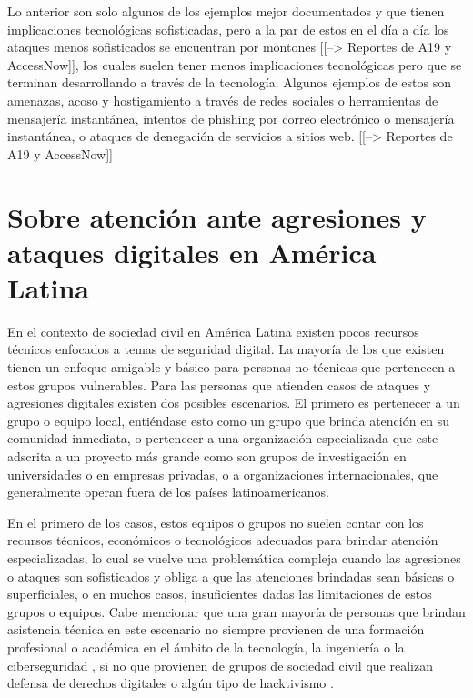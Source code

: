 \documentclass[12pt]{caltech_thesis}
\begin{document}
Lo anterior son solo algunos de los ejemplos mejor documentados y que tienen implicaciones tecnológicas sofisticadas, pero a la par de estos en el día a día los ataques menos sofisticados se encuentran por montones [[--> Reportes de A19 y AccessNow]], los cuales suelen tener menos implicaciones tecnológicas pero que se terminan desarrollando a través de la tecnología. Algunos ejemplos de estos son amenazas, acoso y hostigamiento a través de redes sociales o herramientas de mensajería instantánea, intentos de phishing por correo electrónico o mensajería instantánea, o ataques de denegación de servicios a sitios web. [[--> Reportes de A19 y AccessNow]]

\section{Sobre atención ante agresiones y ataques digitales en América Latina}

En el contexto de sociedad civil en América Latina  existen pocos recursos técnicos enfocados a temas de seguridad digital. La mayoría de los que existen tienen un enfoque amigable y básico para personas no técnicas que pertenecen a estos grupos vulnerables. Para las personas que atienden casos de ataques y agresiones digitales existen dos posibles escenarios. El primero es pertenecer a un grupo o equipo local, entiéndase esto como un grupo que brinda atención en su comunidad inmediata, o pertenecer a una organización especializada que este adscrita a un proyecto más grande como son grupos de investigación en universidades o en empresas privadas, o a organizaciones internacionales, que generalmente operan fuera de los países latinoamericanos.

En el primero de los casos, estos equipos o grupos no suelen contar con los recursos técnicos, económicos o tecnológicos adecuados para brindar atención especializadas, lo cual se vuelve una problemática compleja cuando las agresiones o ataques son sofisticados y obliga a que las atenciones brindadas sean básicas o superficiales, o en muchos casos, insuficientes dadas las limitaciones de estos grupos o equipos. Cabe mencionar que una gran mayoría de personas que brindan asistencia técnica en este escenario no siempre provienen de una formación profesional o académica en el ámbito de la tecnología, la ingeniería o la ciberseguridad , si no que provienen de grupos de sociedad civil que realizan defensa de derechos digitales  o algún tipo de hacktivismo .
\end{document}
